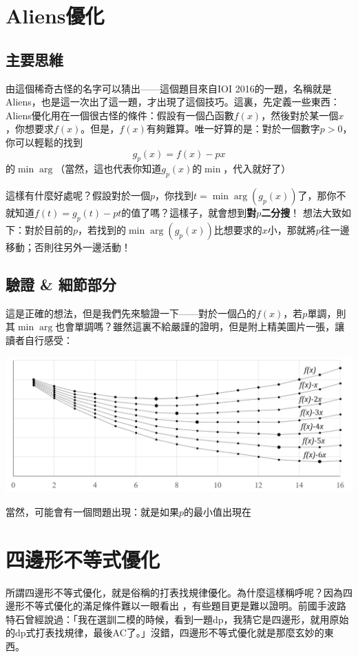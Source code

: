 \section{Aliens優化}
	\subsection{主要思維}
		由這個稀奇古怪的名字可以猜出——這個題目來自IOI 2016的一題，名稱就是Aliens，也是這一次出了這一題，才出現了這個技巧。這裏，先定義一些東西：
		Aliens優化用在一個很古怪的條件：假設有一個凸函數$f(x)$，然後對於某一個$x$，你想要求$f(x)$。但是，$f(x)$有夠難算。唯一好算的是：對於一個數字$p > 0$，你可以輕鬆的找到
		$$g_p(x) = f(x) - px$$
		的$\min\arg$（當然，這也代表你知道$g_p(x)$的$\min$，代入就好了）
		
		這樣有什麼好處呢？假設對於一個$p$，你找到$t = \min \arg(g_p(x))$了，那你不就知道$f(t) = g_p(t) - pt$的值了嗎？這樣子，就會想到\textbf{對$p$二分搜}！
			想法大致如下：對於目前的$p$，若找到的$\min\arg(g_p(x))$比想要求的$x$小，那就將$p$往一邊移動；否則往另外一邊活動！
	\subsection{驗證 \& 細節部分}
		這是正確的想法，但是我們先來驗證一下——對於一個凸的$f(x)$，若$p$單調，則其$\min\arg$也會單調嗎？雖然這裏不給嚴謹的證明，但是附上精美圖片一張，讓讀者自行感受：
		\begin{center}
			\includegraphics{images/aliensopt}
		\end{center}
		當然，可能會有一個問題出現：就是如果$p$的最小值出現在
	\section{四邊形不等式優化}
	
	所謂四邊形不等式優化，就是俗稱的打表找規律優化。為什麼這樣稱呼呢？因為四邊形不等式優化的滿足條件難以一眼看出  ，有些題目更是難以證明。前國手波路特石曾經說過：「我在選訓二模的時候，看到一題dp，我猜它是四邊形，就用原始的dp式打表找規律，最後AC了。」沒錯，四邊形不等式優化就是那麼玄妙的東西。
	
